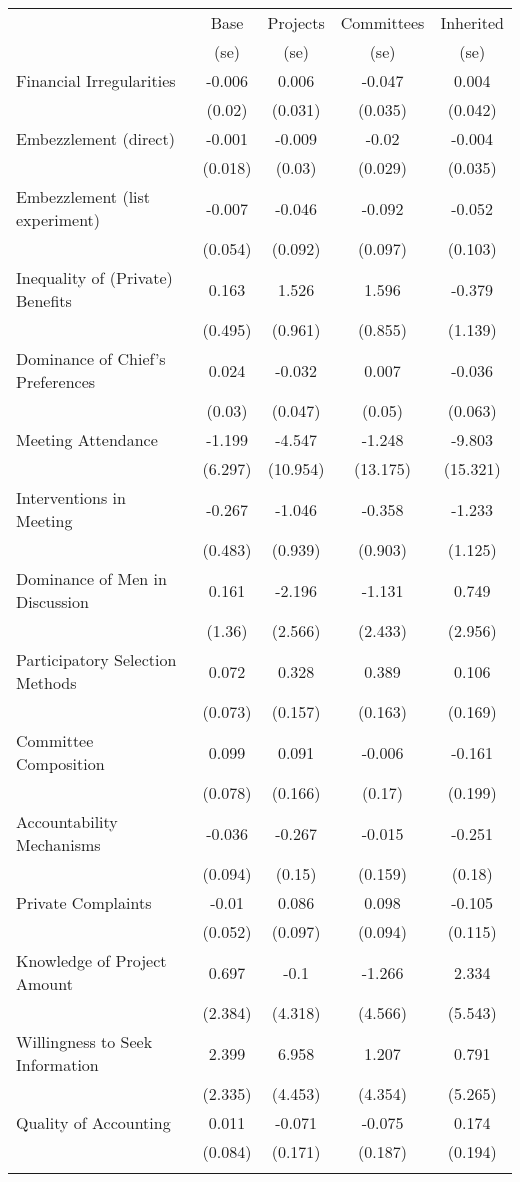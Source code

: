 \centering  
 \scriptsize  
 \begin{tabular}{lc|ccc}  
 	& Base      &   Projects &  Committees &  Inherited    \\   
 	& (se)      &   (se)      &  (se)      &  (se)    \\ \hline \hline  
 Financial Irregularities&-0.006&0.006&-0.047&0.004 \\  
 &(0.02)&(0.031)&(0.035)&(0.042) \\  
 Embezzlement (direct)&-0.001&-0.009&-0.02&-0.004 \\  
 &(0.018)&(0.03)&(0.029)&(0.035) \\  
 Embezzlement (list experiment)&-0.007&-0.046&-0.092&-0.052 \\  
 &(0.054)&(0.092)&(0.097)&(0.103) \\  
 Inequality of (Private) Benefits&0.163&1.526&1.596&-0.379 \\  
 &(0.495)&(0.961)&(0.855)&(1.139) \\  
 Dominance of Chief's Preferences&0.024&-0.032&0.007&-0.036 \\  
 &(0.03)&(0.047)&(0.05)&(0.063) \\  
 Meeting Attendance&-1.199&-4.547&-1.248&-9.803 \\  
 &(6.297)&(10.954)&(13.175)&(15.321) \\  
 Interventions in Meeting&-0.267&-1.046&-0.358&-1.233 \\  
 &(0.483)&(0.939)&(0.903)&(1.125) \\  
 Dominance of Men in Discussion&0.161&-2.196&-1.131&0.749 \\  
 &(1.36)&(2.566)&(2.433)&(2.956) \\  
 Participatory Selection Methods&0.072&0.328&0.389&0.106 \\  
 &(0.073)&(0.157)&(0.163)&(0.169) \\  
 Committee Composition&0.099&0.091&-0.006&-0.161 \\  
 &(0.078)&(0.166)&(0.17)&(0.199) \\  
 Accountability Mechanisms&-0.036&-0.267&-0.015&-0.251 \\  
 &(0.094)&(0.15)&(0.159)&(0.18) \\  
 Private Complaints&-0.01&0.086&0.098&-0.105 \\  
 &(0.052)&(0.097)&(0.094)&(0.115) \\  
 Knowledge of Project Amount&0.697&-0.1&-1.266&2.334 \\  
 &(2.384)&(4.318)&(4.566)&(5.543) \\  
 Willingness to Seek Information&2.399&6.958&1.207&0.791 \\  
 &(2.335)&(4.453)&(4.354)&(5.265) \\  
 Quality of Accounting&0.011&-0.071&-0.075&0.174 \\  
 &(0.084)&(0.171)&(0.187)&(0.194) \\  
 \hline \hline  
 \label{table_main_gov}  
 \end{tabular}  
